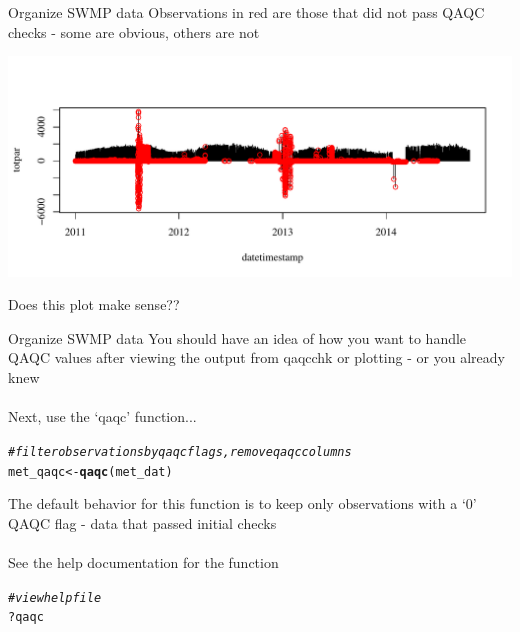 \documentclass[xcolor=svgnames]{beamer}\usepackage[]{graphicx}\usepackage[]{color}
\makeatletter
\def\maxwidth{ %
  \ifdim\Gin@nat@width>\linewidth
    \linewidth
  \else
    \Gin@nat@width
  \fi
}
\newcommand{\hlcom}[1]{\textcolor[rgb]{0.678,0.584,0.686}{\textit{#1}}}%
\newcommand{\hlopt}[1]{\textcolor[rgb]{0,0,0}{#1}}%
\newcommand{\hlstd}[1]{\textcolor[rgb]{0.345,0.345,0.345}{#1}}%
\newcommand{\hlkwb}[1]{\textcolor[rgb]{0.69,0.353,0.396}{#1}}%
\newcommand{\hlkwd}[1]{\textcolor[rgb]{0.737,0.353,0.396}{\textbf{#1}}}%
\newenvironment{kframe}{%
 \def\at@end@of@kframe{}%
 \ifinner\ifhmode%
  \def\at@end@of@kframe{\end{minipage}}%
  \begin{minipage}{\columnwidth}%
 \fi\fi%
 \def\FrameCommand##1{\hskip\@totalleftmargin \hskip-\fboxsep
 \colorbox{shadecolor}{##1}\hskip-\fboxsep
     \hskip-\linewidth \hskip-\@totalleftmargin \hskip\columnwidth}%
 \MakeFramed {\advance\hsize-\width
   \@totalleftmargin\z@ \linewidth\hsize
   \@setminipage}}%
 {\par\unskip\endMakeFramed%
 \at@end@of@kframe}
\newenvironment{knitrout}{}{} %
\makeatother
\begin{document}
\begin{frame}[containsverbatim]{Organize SWMP data}
Observations in red are those that did not pass QAQC checks - some are obvious, others are not
\begin{knitrout}\scriptsize
{}\color{fgcolor}

{\centering \includegraphics[width=\maxwidth]{figure/qaqc_ex} 

}



\end{knitrout}
Does this plot make sense??
\end{frame}

\begin{frame}[containsverbatim]{Organize SWMP data}
You should have an idea of how you want to handle QAQC values after viewing the output from qaqcchk or plotting - or you already knew \\~\\
Next, use the `qaqc' function...
\begin{knitrout}\scriptsize
{}\color{fgcolor}\begin{kframe}
\begin{alltt}
\hlcom{# filter observations by qaqc flags, remove qaqc columns}
\hlstd{met_qaqc} \hlkwb{<-} \hlkwd{qaqc}\hlstd{(met_dat)}
\end{alltt}
\end{kframe}
\end{knitrout}
The default behavior for this function is to keep only observations with a `0' QAQC flag - data that passed initial checks\\~\\
See the help documentation for the function
\begin{knitrout}\scriptsize
{}\color{fgcolor}\begin{kframe}
\begin{alltt}
\hlcom{# view help file}
\hlopt{?}\hlstd{qaqc}
\end{alltt}
\end{kframe}
\end{knitrout}
\end{frame}
\end{document}
